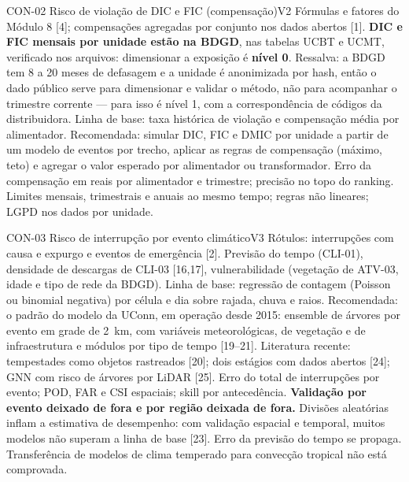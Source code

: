\begin{ficha}{CON-02 \textperiodcentered{} Risco de violação de DIC e FIC (compensação)}{V2}
 Fórmulas e fatores do Módulo 8 [4]; compensações agregadas por
conjunto nos dados abertos [1]. \textbf{DIC e FIC mensais por unidade estão
na BDGD}, nas tabelas UCBT e UCMT, verificado nos arquivos: dimensionar a
exposição é \textbf{nível 0}. Ressalva: a BDGD tem 8 a 20 meses de defasagem e
a unidade é anonimizada por hash, então o dado público serve para dimensionar
e validar o método, não para acompanhar o trimestre corrente --- para isso é
nível 1, com a correspondência de códigos da distribuidora.
 Linha de base: taxa histórica de violação e compensação
média por alimentador. Recomendada: simular DIC, FIC e DMIC por unidade a
partir de um modelo de eventos por trecho, aplicar as regras de compensação
(máximo, teto) e agregar o valor esperado por alimentador ou transformador.
 Erro da compensação em reais por alimentador e trimestre;
precisão no topo do ranking.
 Limites mensais, trimestrais e anuais ao mesmo tempo;
regras não lineares; LGPD nos dados por unidade.
\end{ficha}

\begin{ficha}{CON-03 \textperiodcentered{} Risco de interrupção por evento climático}{V3}
 Rótulos: interrupções com causa e expurgo e eventos de
emergência [2]. Previsão do tempo (CLI-01), densidade de descargas de
CLI-03 [16,17], vulnerabilidade (vegetação de ATV-03, idade e tipo de rede da
BDGD).
 Linha de base: regressão de contagem (Poisson ou binomial
negativa) por célula e dia sobre rajada, chuva e raios. Recomendada: o
padrão do modelo da UConn, em operação desde 2015: ensemble de árvores por
evento em grade de 2~km, com variáveis meteorológicas, de vegetação e de
infraestrutura e módulos por tipo de tempo [19--21]. Literatura recente:
tempestades como objetos rastreados [20]; dois estágios com dados abertos
[24]; GNN com risco de árvores por LiDAR [25].
 Erro do total de interrupções por evento; POD, FAR e CSI
espaciais; skill por antecedência. \textbf{Validação por evento deixado de
fora e por região deixada de fora.}
 Divisões aleatórias inflam a estimativa de desempenho: com validação
espacial e temporal, muitos modelos não superam a linha de base [23]. Erro da
previsão do tempo se propaga. Transferência de modelos de clima temperado
para convecção tropical não está comprovada.
\end{ficha}

